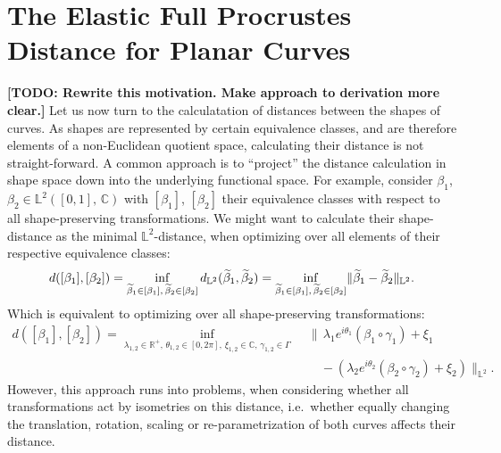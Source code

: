 \section{The Elastic Full Procrustes Distance for Planar Curves}
\label{theo:dist}
\textbf{[TODO: Rewrite this motivation. Make approach to derivation more clear.]}
Let us now turn to the calculatation of distances between the shapes of curves.
As shapes are represented by certain equivalence classes, and are therefore elements of a non-Euclidean quotient space, calculating their distance is not straight-forward.
A common approach is to \enquote{project} the distance calculation in shape space down into the underlying functional space.
For example, consider $\beta_1$, $\beta_2 \in \mathbb{L}^2([0,1],\, \mathbb{C})$ with $[\beta_1]$, $[\beta_2]$ their equivalence classes with respect to all shape-preserving transformations.
We might want to calculate their shape-distance as the minimal $\mathbb{L}^2$-distance, when optimizing over all elements of their respective equivalence classes:
$$ d([\beta_1], [\beta_2]) = \inf_{\widetilde \beta_1 \in [\beta_1],\,\widetilde \beta_2 \in [\beta_2]} d_{\mathbb{L}^2}(\widetilde \beta_1, \widetilde \beta_2) = \inf_{\widetilde\beta_1 \in [\beta_1],\, \widetilde\beta_2 \in [\beta_2]} \lVert \widetilde\beta_1 - \widetilde\beta_2\rVert_{\mathbb{L}^2}.$$
Which is equivalent to optimizing over all shape-preserving transformations:
\begin{align*}
  d([\beta_1], [\beta_2]) = \inf_{\lambda_{1,2} \in \mathbb{R}^+,\,\theta_{1,2} \in [0,2\pi],\, \xi_{1,2} \in \mathbb{C},\, \gamma_{1,2} \in \Gamma}\,\, & \bigg\lVert \,\lambda_1 e^{i\theta_1}(\beta_1 \circ \gamma_1) + \xi_1 \\
  &\quad - \left(\lambda_2 e^{i\theta_2}(\beta_2 \circ \gamma_2) + \xi_2 \right) \bigg\rVert_{\mathbb{L}^2}.
\end{align*}
However, this approach runs into problems, when considering whether all transformations act by isometries on this distance, i.e.\ whether equally changing the translation, rotation, scaling or re-parametrization of both curves affects their distance. 

